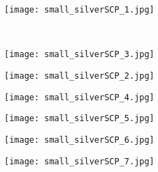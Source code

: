\begin{figure}
	\centering
	\begin{minipage}{0.19\textwidth}
		\begin{subfigure}{\linewidth}
			\centering\texttt{[image: small\_silverSCP\_1.jpg]}
			\caption{\label{silverSCP_1}}
		\end{subfigure}\\[2mm]
		\begin{subfigure}{\linewidth}
			\centering\texttt{[image: small\_silverSCP\_3.jpg]}
			\caption{\label{silverSCP_2}}
		\end{subfigure}
	\end{minipage}%
	\begin{minipage}{.16\textwidth}
		\begin{subfigure}{\linewidth}
			\centering\texttt{[image: small\_silverSCP\_2.jpg]}
			\caption{\label{silverSCP_3}}
		\end{subfigure}
	\end{minipage}%
	\begin{minipage}{.20\textwidth}
		\begin{subfigure}{\linewidth}
			\centering\texttt{[image: small\_silverSCP\_4.jpg]}
			\caption{\label{silverSCP_4}}
		\end{subfigure}
	\end{minipage}%
	\begin{minipage}{.13\textwidth}
		\begin{subfigure}{\linewidth}
			\centering\texttt{[image: small\_silverSCP\_5.jpg]}
			\caption{\label{silverSCP_5}}
		\end{subfigure}
	\end{minipage}%
	\begin{minipage}{.15\textwidth}
		\begin{subfigure}{\linewidth}
			\centering\texttt{[image: small\_silverSCP\_6.jpg]}
			\caption{\label{silverSCP_6}}
		\end{subfigure}
	\end{minipage}%
	\begin{minipage}{.16\textwidth}
		\begin{subfigure}{\linewidth}
			\centering\texttt{[image: small\_silverSCP\_7.jpg]}
			\caption{\label{silverSCP_anealing}}
		\end{subfigure}
	\end{minipage}%

\end{figure}
